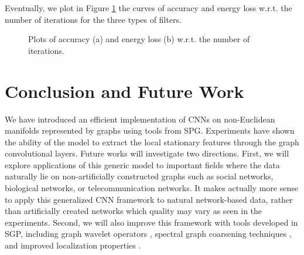 \documentclass{article}
\begin{document}
\noindent
Eventually, we plot in Figure  \ref{fig1} the curves of accuracy and energy loss w.r.t. the number of iterations for the three types of filters. 


\begin{figure}[h!]
\centering
{}
\hspace{0.5cm}
\caption{Plots of accuracy (a) and energy loss (b) w.r.t. the number of iterations.}
\label{fig1}
\end{figure}



\section{Conclusion and Future Work}
\vspace{-0.2cm}
We have introduced an efficient implementation of CNNs on non-Euclidean manifolds represented by graphs using tools from SPG. Experiments have shown the ability of the model to extract the local stationary features through the graph convolutional layers. Future works will investigate two directions. First, we will explore applications of this generic model to important fields where the data naturally lie on non-artificially constructed graphs such as social networks, biological networks, or telecommunication networks. It makes actually more sense to apply this generalized CNN framework to natural network-based data, rather than artificially created networks which quality may vary as seen in the experiments. Second, we will also improve this framework with tools developed in SGP, including graph wavelet operators \cite{art:HammondVandergheynstGribonval11GraphWav,art:CoifmanLafon06DifMap,pro:GavishNadlerCoifman10GraphHaar,pro:ChenChengMallat14deepHaar,pro:RustamovGuibas14deepHaar}, spectral graph coarsening techniques \cite{art:ShumanFarajiVandergheynst16PyramTrans}, and improved localization properties \cite{pro:TsitsveroBarbarossa15Uncert,pro:PasdeloupAlamiGriponRabbat15Uncert,art:PerraudinRicaudShumanVandergheynst16Uncert}.












\newpage


{
{\small
%

}
}
\end{document}
